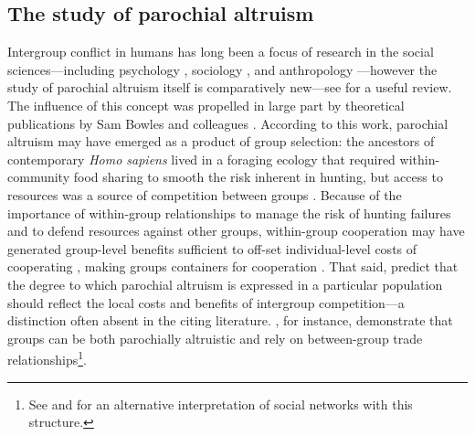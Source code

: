 \documentclass[bibauthoryear]{aa}
\begin{document}
\subsection{The study of parochial altruism}\label{onepointone}

Intergroup conflict in humans has long been a focus of research in the social sciences---including psychology \citep[e.g.,][]{tajfel1982social, yamagishi2016parochial}, sociology \citep[e.g.,][]{gluckman1960tribalism}, and anthropology \citep{Vayda1961}---however the study of parochial altruism itself is comparatively new---see \citet{de2014parochial} for a useful review. 
 The influence of this concept was propelled in large part by  theoretical publications by Sam Bowles and colleagues \citep{choi2007coevolution, bowles2003origins, bowles2004persistent}. According to this work, parochial altruism may have emerged as a product of group selection: the ancestors of contemporary \textit{Homo sapiens} lived in a foraging ecology that required within-community food sharing to smooth the risk inherent in hunting, but access to resources was a source of competition between groups \citep{choi2007coevolution}. Because of the importance of within-group relationships to  manage the risk of hunting failures and to defend resources against other groups, within-group cooperation may have generated group-level benefits sufficient to off-set individual-level costs of cooperating \citep{choi2007coevolution}, making groups containers for cooperation \citep{boydricherson1985}. That said, \citet{bowles2003origins} predict that the degree to which parochial altruism is expressed in a particular population should reflect the local costs and benefits of intergroup competition---a distinction often absent in the citing literature.  \citet{bowles2004persistent}, for instance, demonstrate that groups can be both parochially altruistic and rely on between-group trade relationships\footnote{See \citet{yamagishi2011trust} and \citet{yamagishi2016parochial} for an alternative interpretation of social networks with this structure.}.
\end{document}
